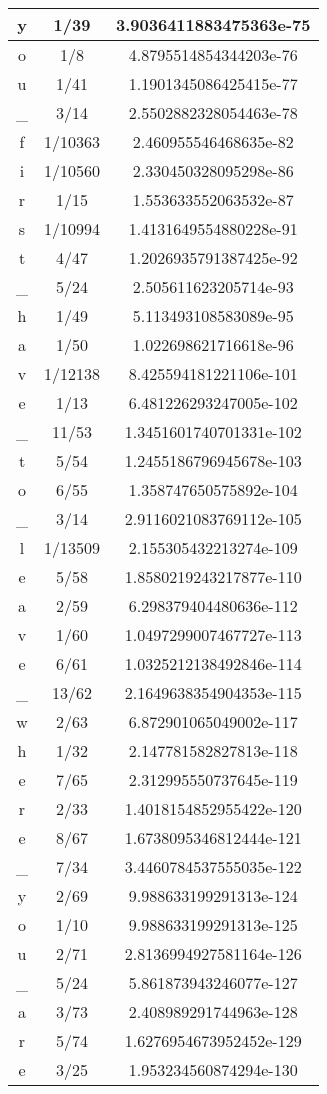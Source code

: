\begin{center}
\begin{longtable}{|c|c|c|}
y&1/39&3.9036411883475363e-75\\ \hline  o&1/8&4.8795514854344203e-76\\ \hline  u&1/41&1.1901345086425415e-77\\ \hline  \_&3/14&2.5502882328054463e-78\\ \hline  f&1/10363&2.460955546468635e-82\\ \hline  i&1/10560&2.330450328095298e-86\\ \hline  r&1/15&1.553633552063532e-87\\ \hline  s&1/10994&1.4131649554880228e-91\\ \hline  t&4/47&1.2026935791387425e-92\\ \hline  \_&5/24&2.505611623205714e-93\\ \hline  h&1/49&5.113493108583089e-95\\ \hline  a&1/50&1.022698621716618e-96\\ \hline  v&1/12138&8.425594181221106e-101\\ \hline  e&1/13&6.481226293247005e-102\\ \hline  \_&11/53&1.3451601740701331e-102\\ \hline  t&5/54&1.2455186796945678e-103\\ \hline  o&6/55&1.358747650575892e-104\\ \hline  \_&3/14&2.9116021083769112e-105\\ \hline  l&1/13509&2.155305432213274e-109\\ \hline  e&5/58&1.8580219243217877e-110\\ \hline  a&2/59&6.298379404480636e-112\\ \hline  v&1/60&1.0497299007467727e-113\\ \hline  e&6/61&1.0325212138492846e-114\\ \hline  \_&13/62&2.1649638354904353e-115\\ \hline  w&2/63&6.872901065049002e-117\\ \hline  h&1/32&2.147781582827813e-118\\ \hline  e&7/65&2.312995550737645e-119\\ \hline  r&2/33&1.4018154852955422e-120\\ \hline  e&8/67&1.6738095346812444e-121\\ \hline  \_&7/34&3.4460784537555035e-122\\ \hline  y&2/69&9.988633199291313e-124\\ \hline  o&1/10&9.988633199291313e-125\\ \hline  u&2/71&2.8136994927581164e-126\\ \hline  \_&5/24&5.861873943246077e-127\\ \hline  a&3/73&2.408989291744963e-128\\ \hline  r&5/74&1.6276954673952452e-129\\ \hline  e&3/25&1.953234560874294e-130\\ \hline 

    \end{longtable}
\end{center}

